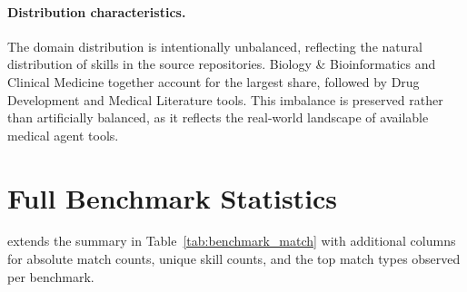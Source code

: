\paragraph{Distribution characteristics.}
The domain distribution is intentionally unbalanced, reflecting the natural distribution of skills in the source repositories.
Biology \& Bioinformatics and Clinical Medicine together account for the largest share, followed by Drug Development and Medical Literature tools.
This imbalance is preserved rather than artificially balanced, as it reflects the real-world landscape of available medical agent tools.


\section{Full Benchmark Statistics}
\label{app:full_benchmark}

 extends the summary in Table~\ref{tab:benchmark_match} with additional columns for absolute match counts, unique skill counts, and the top match types observed per benchmark.

